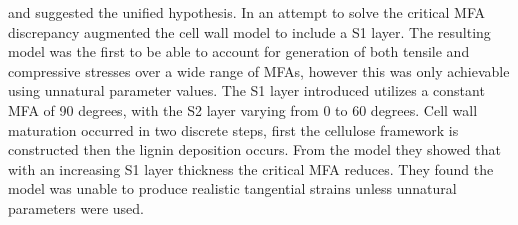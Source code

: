 \citet[in Japanese]{Okuyama_1993} and \citet{ISI:A1995QJ03000001} suggested the
unified hypothesis. In an attempt to solve the critical MFA
discrepancy \citet{ISI:A1995QJ03000001} augmented the \citet{Barber_1964} cell wall
model to include a S1 layer. The resulting model was the first to be able to
account for generation of both tensile and compressive stresses over a wide
range of MFAs, however this was only achievable using unnatural parameter values. The S1 layer introduced utilizes a constant MFA
of 90 degrees, with the S2 layer varying from 0 to 60 degrees. Cell wall maturation
occurred in two discrete steps, first the cellulose framework is constructed then
the lignin deposition occurs. From the model they showed that with an
increasing S1 layer thickness the critical MFA reduces. They found the model
was unable to produce realistic tangential strains unless unnatural parameters
were used.